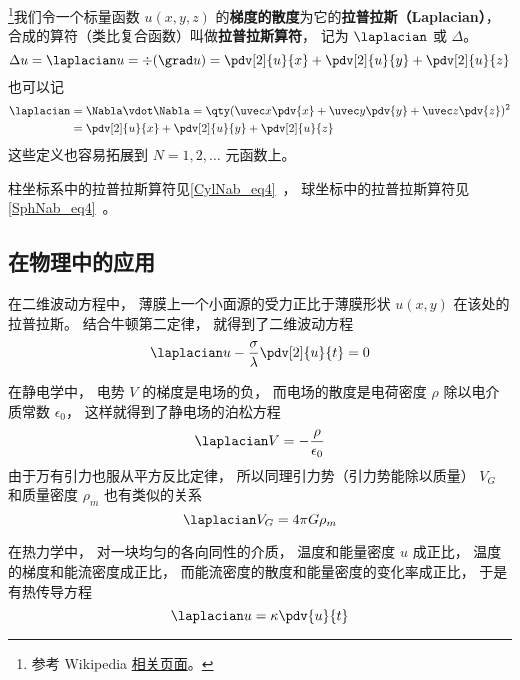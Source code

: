 

\footnote{参考 Wikipedia \href{https://en.wikipedia.org/wiki/Laplace_operator}{相关页面}。}我们令一个标量函数 $u(x, y, z)$ 的\textbf{梯度的散度}为它的\textbf{拉普拉斯（Laplacian）}， 合成的算符（类比复合函数）叫做\textbf{拉普拉斯算符}， 记为 $\laplacian$ 或 $\Delta$。
\begin{equation}
\Delta u = \laplacian u = \div (\grad u) = \pdv[2]{u}{x} + \pdv[2]{u}{y} + \pdv[2]{u}{z}
\end{equation}
也可以记
\begin{equation}
\begin{aligned}
\laplacian &= \Nabla \vdot \Nabla = \qty(\uvec x\pdv{x} + \uvec y\pdv{y} + \uvec z\pdv{z})^2\\
&= \pdv[2]{u}{x} + \pdv[2]{u}{y} + \pdv[2]{u}{z}
\end{aligned}
\end{equation}
这些定义也容易拓展到 $N = 1, 2, \dots$ 元函数上。

柱坐标系中的拉普拉斯算符见\autoref{CylNab_eq4}~， 球坐标中的拉普拉斯算符见\autoref{SphNab_eq4}~。

\subsection{在物理中的应用}
在二维波动方程中， 薄膜上一个小面源的受力正比于薄膜形状 $u(x, y)$ 在该处的拉普拉斯。 结合牛顿第二定律， 就得到了二维波动方程
\begin{equation}
\laplacian u - \frac{\sigma}{\lambda}\pdv[2]{u}{t} = 0
\end{equation}

在静电学中， 电势 $V$ 的梯度是电场的负， 而电场的散度是电荷密度 $\rho$ 除以电介质常数 $\epsilon_0$， 这样就得到了静电场的泊松方程
\begin{equation}
\laplacian V = -\frac{\rho}{\epsilon_0}
\end{equation}
由于万有引力也服从平方反比定律， 所以同理引力势（引力势能除以质量） $V_G$ 和质量密度 $\rho_m$ 也有类似的关系
\begin{equation}
\laplacian V_G = 4\pi G \rho_m
\end{equation}

在热力学中， 对一块均匀的各向同性的介质， 温度和能量密度 $u$ 成正比， 温度的梯度和能流密度成正比， 而能流密度的散度和能量密度的变化率成正比， 于是有热传导方程
\begin{equation}
\laplacian u = \kappa \pdv{u}{t}
\end{equation}
